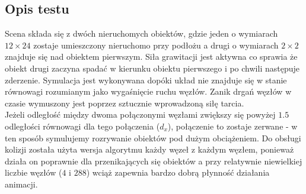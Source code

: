\documentclass[12pt, letterpaper]{report}
\begin{document}
    \subsection{Opis testu}
    Scena składa się z dwóch nieruchomych obiektów, gdzie jeden o wymiarach $12 \times 24$ zostaje umieszczony nieruchomo 
    przy podłożu a drugi o wymiarach $2 \times 2$ znajduje się nad obiektem pierwszym. Siła grawitacji jest aktywna co 
    sprawia że obiekt drugi zaczyna spadać w kierunku obiektu pierwszego i po chwili następuje zderzenie. 
    Symulacja jest wykonywana dopóki układ nie znajduje się w stanie równowagi rozumianym jako wygaśnięcie ruchu
    węzłów. Zanik drgań węzłów w czasie wymuszony jest poprzez sztucznie wprowadzoną siłę tarcia.\\ 

    Jeżeli odległość między dwoma połączonymi węzłami zwiększy się powyżej $1.5$ odległości równowagi dla 
    tego połączenia ($d_x$), połączenie to zostaje zerwane - w ten sposób symulujemy rozrywanie obiektów pod dużym 
    obciążeniem. Do obsługi kolizji została użyta wersja algorytmu każdy węzeł z każdym węzłem, ponieważ
    działa on poprawnie dla przenikających się obiektów a przy relatywnie niewielkiej liczbie 
    węzłów ($4$ i $288$) wciąż zapewnia bardzo dobrą płynność działania animacji.
\end{document}
